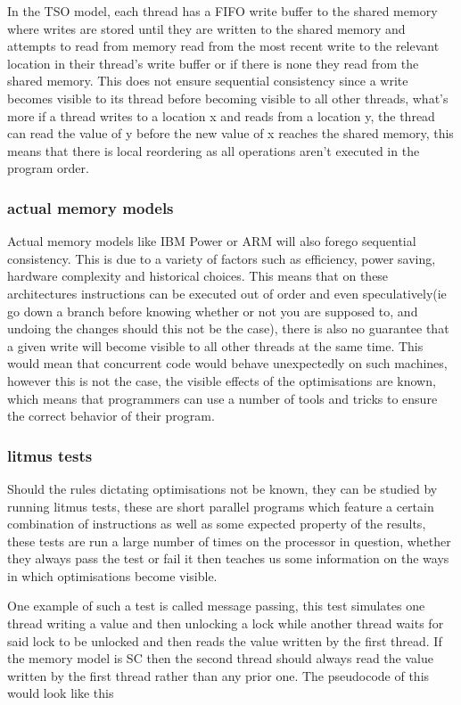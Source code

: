 \documentclass[a4,12pt]{article}
\begin{document}
In the TSO model, each thread has a FIFO write buffer to the shared memory where writes are stored until they are written to the shared memory and attempts to read from memory read from the most recent write to the relevant location in their thread's write buffer or if there is none they read from the shared memory. This does not ensure sequential consistency since a write becomes visible to its thread before becoming visible to all other threads, what's more if a thread writes to a location x and reads from a location y, the thread can read the value of y before the new value of x reaches the shared memory, this means that there is local reordering as all operations aren't executed in the program order.

\subsubsection{actual memory models}

Actual memory models like IBM Power or ARM will also forego sequential consistency. This is due to a variety of factors such as efficiency, power saving, hardware complexity and historical choices. This means that on these architectures instructions can be executed out of order and even speculatively(ie go down a branch before knowing whether or not you are supposed to, and undoing the changes should this not be the case), there is also no guarantee that a given write will become visible to all other threads at the same time. This would mean that concurrent code would behave unexpectedly on such machines, however this is not the case, the visible effects of the optimisations are known, which means that programmers can use a number of tools and tricks to ensure the correct behavior of their program.

\subsubsection{litmus tests}

Should the rules dictating optimisations not be known, they can be studied by running litmus tests, these are short parallel programs which feature a certain combination of instructions as well as some expected property of the results, these tests are run a large number of times on the processor in question, whether they always pass the test or fail it then teaches us some information on the ways in which optimisations become visible.

One example of such a test is called message passing, this test simulates one thread writing a value and then unlocking a lock while another thread waits for said lock to be unlocked and then reads the value written by the first thread. If the memory model is SC then the second thread should always read the value written by the first thread rather than any prior one. The pseudocode of this would look like this
\end{document}
